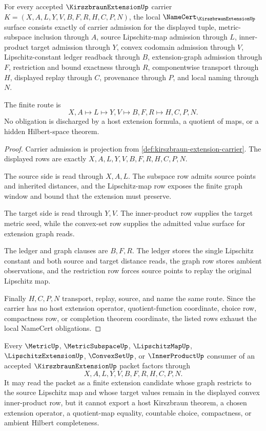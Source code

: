 \begin{theorem}
\label{thm:kirszbraun-extension-namecert-obligations}
For every accepted $\KirszbraunExtensionUp$ carrier $K=(X,A,L,Y,V,B,F,R,H,C,P,N)$, the local $\NameCert_{\KirszbraunExtensionUp}$ surface consists exactly of carrier admission for the displayed tuple, metric-subspace inclusion through $A$, source Lipschitz-map admission through $L$, inner-product target admission through $Y$, convex codomain admission through $V$, Lipschitz-constant ledger readback through $B$, extension-graph admission through $F$, restriction and bound exactness through $R$, componentwise transport through $H$, displayed replay through $C$, provenance through $P$, and local naming through $N$.

The finite route is
$$
X,A \longmapsto L \longmapsto Y,V \longmapsto B,F,R \longmapsto H,C,P,N .
$$
No obligation is discharged by a host extension formula, a quotient of maps, or a hidden Hilbert-space theorem.
\end{theorem}
\begin{proof}
Carrier admission is projection from \autoref{def:kirszbraun-extension-carrier}. The displayed rows are exactly $X,A,L,Y,V,B,F,R,H,C,P,N$.

The source side is read through $X,A,L$. The subspace row admits source points and inherited distances, and the Lipschitz-map row exposes the finite graph window and bound that the extension must preserve.

The target side is read through $Y,V$. The inner-product row supplies the target metric seed, while the convex-set row supplies the admitted value surface for extension graph reads.

The ledger and graph clauses are $B,F,R$. The ledger stores the single Lipschitz constant and both source and target distance reads, the graph row stores ambient observations, and the restriction row forces source points to replay the original Lipschitz map.

Finally $H,C,P,N$ transport, replay, source, and name the same route. Since the carrier has no host extension operator, quotient-function coordinate, choice row, compactness row, or completion theorem coordinate, the listed rows exhaust the local NameCert obligations.
\end{proof}
\begin{theorem}
\label{thm:kirszbraun-extension-nonescape}
Every $\MetricUp$, $\MetricSubspaceUp$, $\LipschitzMapUp$, $\LipschitzExtensionUp$, $\ConvexSetUp$, or $\InnerProductUp$ consumer of an accepted $\KirszbraunExtensionUp$ packet factors through
$$
X,A,L,Y,V,B,F,R,H,C,P,N .
$$
It may read the packet as a finite extension candidate whose graph restricts to the source Lipschitz map and whose target values remain in the displayed convex inner-product row, but it cannot export a host Kirszbraun theorem, a chosen extension operator, a quotient-map equality, countable choice, compactness, or ambient Hilbert completeness.
\end{theorem}
